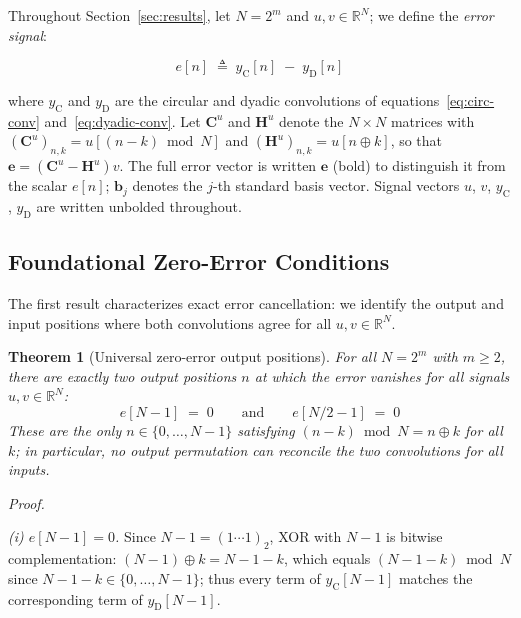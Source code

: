 \documentclass[11pt]{article}
\newtheorem{theorem}{Theorem}
\begin{document}
Throughout Section~\ref{sec:results}, let $N = 2^m$ and $u, v \in \mathbb{R}^N$; we define the \emph{error signal}:

\begin{equation}
    e[n] \;\triangleq\; y_{\mathrm{C}}[n] \;-\; y_{\mathrm{D}}[n]
\end{equation}

\noindent where $y_{\mathrm{C}}$ and $y_{\mathrm{D}}$ are the circular and dyadic convolutions of equations~\eqref{eq:circ-conv} and~\eqref{eq:dyadic-conv}. Let $\mathbf{C}^u$ and $\mathbf{H}^u$ denote the $N\times N$ matrices with $(\mathbf{C}^u)_{n,k} = u[(n-k)\bmod N]$ and $(\mathbf{H}^u)_{n,k} = u[n\oplus k]$, so that $\mathbf{e} = (\mathbf{C}^u - \mathbf{H}^u)v$. The full error vector is written $\mathbf{e}$ (bold) to distinguish it from the scalar $e[n]$; $\mathbf{b}_j$ denotes the $j$-th standard basis vector. Signal vectors $u$, $v$, $y_{\mathrm{C}}$, $y_{\mathrm{D}}$ are written unbolded throughout.

\subsection{Foundational Zero-Error Conditions}
\label{sec:foundational}

The first result characterizes exact error cancellation: we identify the output and input positions where both convolutions agree for all $u, v \in \mathbb{R}^N$.

\begin{theorem}[Universal zero-error output positions]\label{thm:zero-error}
For all $N = 2^m$ with $m \geq 2$, there are exactly two output positions $n$ at which the error vanishes for all signals $u, v \in \mathbb{R}^N$:
\begin{equation}
    e[N-1] \;=\; 0 \qquad \text{and} \qquad e[N/2 - 1] \;=\; 0
\end{equation}
These are the only $n \in \{0,\ldots,N-1\}$ satisfying $(n-k)\bmod N = n \oplus k$ for all $k$; in particular, no output permutation can reconcile the two convolutions for all inputs.
\end{theorem}

\noindent\textit{Proof.}

\smallskip
\noindent\textit{(i) $e[N-1] = 0$.} Since $N-1=(1\cdots1)_2$, XOR with $N-1$ is bitwise complementation: $(N-1)\oplus k = N-1-k$, which equals $(N-1-k)\bmod N$ since $N-1-k\in\{0,\ldots,N-1\}$; thus every term of $y_{\mathrm{C}}[N-1]$ matches the corresponding term of $y_{\mathrm{D}}[N-1]$.
\end{document}
